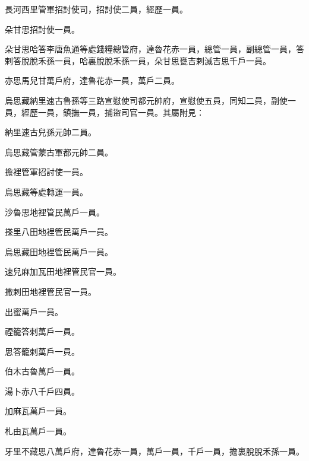 \begin{pinyinscope}
 長河西里管軍招討使司，招討使二員，經歷一員。



 朵甘思招討使一員。



 朵甘思哈答李唐魚通等處錢糧總管府，達魯花赤一員，總管一員，副總管一員，答剌答脫脫禾孫一員，哈裏脫脫禾孫一員，朵甘思甕吉剌滅吉思千戶一員。



 亦思馬兒甘萬戶府，達魯花赤一員，萬戶二員。



 烏思藏納里速古魯孫等三路宣慰使司都元帥府，宣慰使五員，同知二員，副使一員，經歷一員，鎮撫一員，捕盜司官一員。其屬附見：



 納里速古兒孫元帥二員。



 烏思藏管蒙古軍都元帥二員。



 擔裡管軍招討使一員。



 烏思藏等處轉運一員。



 沙魯思地裡管民萬戶一員。



 搽里八田地裡管民萬戶一員。



 烏思藏田地裡管民萬戶一員。



 速兒麻加瓦田地裡管民官一員。



 撒剌田地裡管民官一員。



 出蜜萬戶一員。



 禋籠答剌萬戶一員。



 思答籠剌萬戶一員。



 伯木古魯萬戶一員。



 湯卜赤八千戶四員。



 加麻瓦萬戶一員。



 札由瓦萬戶一員。



 牙里不藏思八萬戶府，達魯花赤一員，萬戶一員，千戶一員，擔裏脫脫禾孫一員。




\end{pinyinscope}
